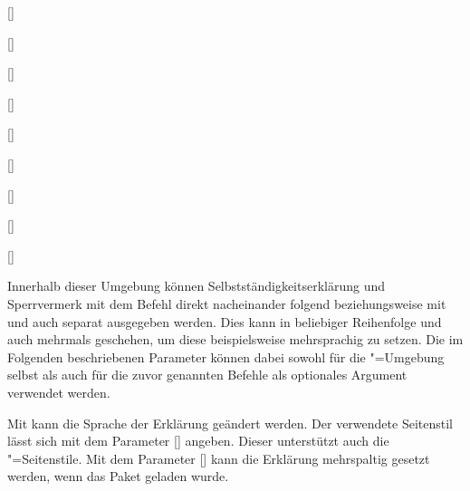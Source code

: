 \begin{Declaration}[v2.02]{[\LParameter]}
\begin{Declaration}{[]}
\begin{Declaration}[v2.02]{%
  []%
}
\begin{Declaration}[v2.02]{%
  []%
}
\begin{Declaration}{[\PSet]}
\begin{Declaration}{%
  []
}
\begin{Declaration}{[]}
\begin{Declaration}{[]}
\begin{Declaration}{[]}

\printdeclarationlist%
%
%
Innerhalb dieser Umgebung können Selbstständigkeitserklärung und Sperrvermerk 
mit dem Befehl  direkt nacheinander folgend beziehungsweise 
mit  und  auch separat ausgegeben werden. 
Dies kann in beliebiger Reihenfolge und auch mehrmals geschehen, um diese 
beispielsweise mehrsprachig zu setzen. Die im Folgenden beschriebenen Parameter 
können dabei sowohl für die "=Umgebung selbst als 
auch für die zuvor genannten Befehle als optionales Argument verwendet werden.

Mit  kann die Sprache der Erklärung 
geändert werden. Der verwendete Seitenstil lässt sich mit dem Parameter 
[] angeben. 
Dieser unterstützt auch die "=Seitenstile. Mit dem 
Parameter [] kann die 
Erklärung mehrspaltig gesetzt werden, wenn das Paket  geladen 
wurde.


\end{Declaration}
\end{Declaration}
\end{Declaration}
\end{Declaration}
\end{Declaration}
\end{Declaration}
\end{Declaration}
\end{Declaration}
\end{Declaration}
